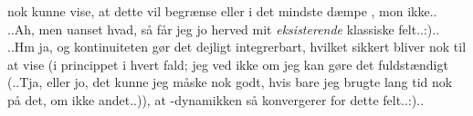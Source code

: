 \documentclass{report}
\begin{document}
nok kunne vise, at dette vil begrænse eller i det mindste dæmpe \omega, mon ikke.. ..Ah, men uanset hvad, så får jeg jo herved mit \emph{eksisterende} klassiske felt..:).. ..Hm ja, og kontinuiteten gør det dejligt integrerbart, hvilket sikkert bliver nok til at vise (i princippet i hvert fald; jeg ved ikke om jeg kan gøre det fuldstændigt (..Tja, eller jo, det kunne jeg måske nok godt, hvis bare jeg brugte lang tid nok på det, om ikke andet..)), at \psi-dynamikken så konvergerer for dette felt..:)..  
\end{document}
